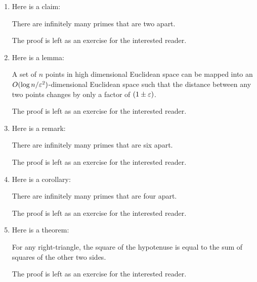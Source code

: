 \documentclass{article}
\begin{document}
\begin{enumerate}
  [
    leftmargin={*},
    label={\arabic*.},
    font={\bf},
    labelsep={10pt},
    itemsep={20pt},
    ref={\arabic*}
  ]
  \item \label{qst:1}
    Here is a claim:
    \begin{claim}\label{clm:1}
      There are infinitely many primes that are two apart.
    \end{claim}
    \begin{proof*}
      The proof is left as an exercise for the interested reader.
    \end{proof*}

  \item \label{qst:2}
    Here is a lemma:
    \begin{lemma}\label{lma:1}
      A set of $n$ points in high dimensional Euclidean space can
      be mapped into an $O(\log n/\varepsilon^2)$-dimensional Euclidean
      space such that the distance between any two points changes
      by only a factor of $(1 \pm \varepsilon)$.
    \end{lemma}
    \begin{proof*}
      The proof is left as an exercise for the interested reader.
    \end{proof*}

  \item \label{qst:3}
    Here is a remark:
    \begin{remark}\label{rem:1}
      There are infinitely many primes that are six apart.
    \end{remark}
    \begin{proof*}
      The proof is left as an exercise for the interested reader.
    \end{proof*}
  
  \item \label{qst:4}
    Here is a corollary:
    \begin{corollary}\label{cor:1}
      There are infinitely many primes that are four apart.
    \end{corollary}
    \begin{proof*}
      The proof is left as an exercise for the interested reader.
    \end{proof*}

  \item \label{qst:5}
    Here is a theorem:
    \begin{theorem}\label{thm:1}
      For any right-triangle, the square of the hypotenuse is equal
      to the sum of squares of the other two sides.
    \end{theorem}
    \begin{proof*}
      The proof is left as an exercise for the interested reader.
    \end{proof*}


\end{enumerate}
\end{document}
